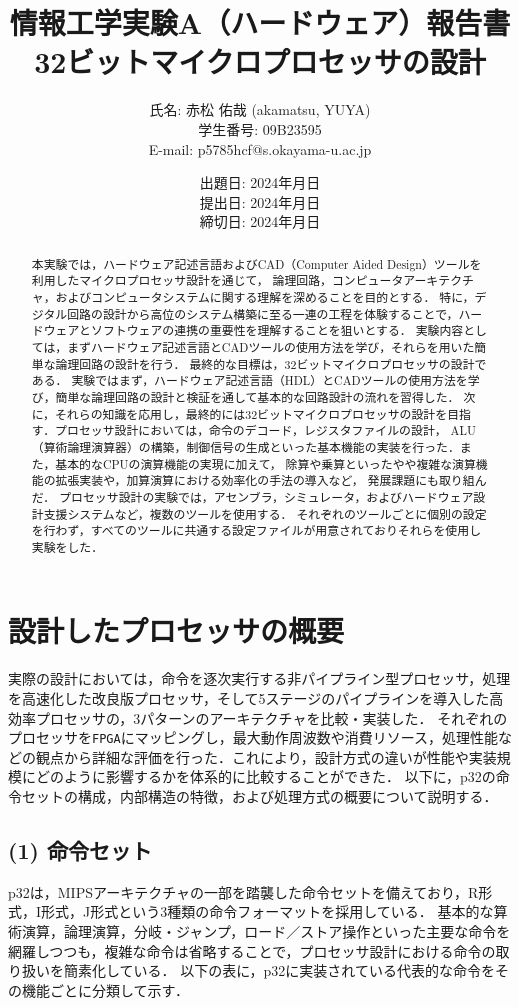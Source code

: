 \documentclass[autodetect-engine,dvi=dvipdfmx,ja=standard,
               a4j,11pt]{bxjsarticle}
\title{{\normalsize 情報工学実験A（ハードウェア）報告書}\\
        32ビットマイクロプロセッサの設計    }
\author{氏名: 赤松 佑哉 (akamatsu, YUYA) \\
        学生番号: 09B23595\\
        E-mail: p5785hcf@s.okayama-u.ac.jp}
\date{出題日: 2024年月日 \\
      提出日: 2024年月日 \\
      締切日: 2024年月日 \\}  %
\begin{document}
\maketitle
\begin{abstract}
本実験では，ハードウェア記述言語およびCAD（Computer Aided Design）ツールを利用したマイクロプロセッサ設計を通じて，
論理回路，コンピュータアーキテクチャ，およびコンピュータシステムに関する理解を深めることを目的とする．
特に，デジタル回路の設計から高位のシステム構築に至る一連の工程を体験することで，ハードウェアとソフトウェアの連携の重要性を理解することを狙いとする．
実験内容としては，まずハードウェア記述言語とCADツールの使用方法を学び，それらを用いた簡単な論理回路の設計を行う．
最終的な目標は，32ビットマイクロプロセッサの設計である．
実験ではまず，ハードウェア記述言語（HDL）とCADツールの使用方法を学び，簡単な論理回路の設計と検証を通して基本的な回路設計の流れを習得した．
次に，それらの知識を応用し，最終的には32ビットマイクロプロセッサの設計を目指す．プロセッサ設計においては，命令のデコード，レジスタファイルの設計，
ALU（算術論理演算器）の構築，制御信号の生成といった基本機能の実装を行った．また，基本的なCPUの演算機能の実現に加えて，
除算や乗算といったやや複雑な演算機能の拡張実装や，加算演算における効率化の手法の導入など，
発展課題にも取り組んだ．
プロセッサ設計の実験では，アセンブラ，シミュレータ，およびハードウェア設計支援システムなど，複数のツールを使用する．
それぞれのツールごとに個別の設定を行わず，すべてのツールに共通する設定ファイルが用意されておりそれらを使用し実験をした．
\end{abstract}
\section{設計したプロセッサの概要}
実際の設計においては，命令を逐次実行する非パイプライン型プロセッサ，処理を高速化した改良版プロセッサ，そして5ステージのパイプラインを導入した高効率プロセッサの，3パターンのアーキテクチャを比較・実装した．
それぞれのプロセッサを\verb|FPGA|にマッピングし，最大動作周波数や消費リソース，処理性能などの観点から詳細な評価を行った．これにより，設計方式の違いが性能や実装規模にどのように影響するかを体系的に比較することができた．
以下に，p32の命令セットの構成，内部構造の特徴，および処理方式の概要について説明する．

\subsection*{(1) 命令セット}
p32は，MIPSアーキテクチャの一部を踏襲した命令セットを備えており，R形式，I形式，J形式という3種類の命令フォーマットを採用している．
基本的な算術演算，論理演算，分岐・ジャンプ，ロード／ストア操作といった主要な命令を網羅しつつも，複雑な命令は省略することで，プロセッサ設計における命令の取り扱いを簡素化している．
以下の表に，p32に実装されている代表的な命令をその機能ごとに分類して示す．
\end{document}
